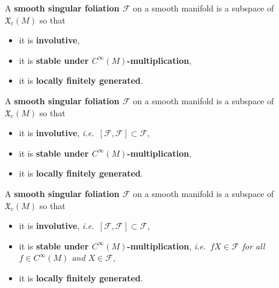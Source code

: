 \documentclass[hyperref={pdfpagelabels=false}]{beamer}
\theoremstyle{plain}
\theoremstyle{remark}
\begin{document}
\begin{frame}
\begin{definition}
A \textbf{smooth singular foliation $\mathcal{F}$} on a smooth manifold is a subspace of $\mathfrak{X}_c(M)$ so that
\begin{itemize}
	\item it is \textbf{involutive},
	\item it is \textbf{stable under $C^\infty(M)$-multiplication},
	\item it is \textbf{locally finitely generated}.
\end{itemize}
\end{definition}
\end{frame}

\begin{frame}
\begin{definition}
A \textbf{smooth singular foliation $\mathcal{F}$} on a smooth manifold is a subspace of $\mathfrak{X}_c(M)$ so that
\begin{itemize}
	\item it is \textbf{involutive}, \textit{i.e.\ $[\mathcal{F}, \mathcal{F}] \subset \mathcal{F}$},
	\item it is \textbf{stable under $C^\infty(M)$-multiplication},
	\item it is \textbf{locally finitely generated}.
\end{itemize}
\end{definition}
\end{frame}

\begin{frame}
\begin{definition}
A \textbf{smooth singular foliation $\mathcal{F}$} on a smooth manifold is a subspace of $\mathfrak{X}_c(M)$ so that
\begin{itemize}
	\item it is \textbf{involutive}, \textit{i.e.\ $[\mathcal{F}, \mathcal{F}] \subset \mathcal{F}$},
	\item it is \textbf{stable under $C^\infty(M)$-multiplication}, \textit{i.e.\ $fX \in \mathcal{F}$ for all $f \in C^\infty(M)$ and $X \in \mathcal{F}$},
	\item it is \textbf{locally finitely generated}.
\end{itemize}
\end{definition}
\end{frame}
\end{document}
